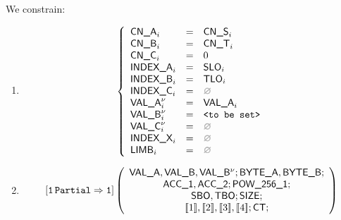 \begin{center}
\end{center}

We constrain:
\begin{enumerate}
	\item 
		\[
			\left\{ \begin{array}{lclr}
				\cnA      _{i}       & = & \cnS_{i}            \\
				\cnB      _{i}       & = & \cnT_{i}            \\
				\cnC      _{i}       & = & 0                   \\
				\indexA   _{i}       & = & \slo_{i}            \\
				\indexB   _{i}       & = & \tlo_{i}            \\
				\indexC   _{i}       & = & \nothing            \\
				\valA     _{i}\new{} & = & \valA_{i}           \\
				\valB     _{i}\new{} & = & \valueToBeSet       \\
				\valC     _{i}\new{} & = & \nothing            \\
				\indexX   _{i}       & = & \nothing            \\
				\limb     _{i}       & = & \nothing            \\
			\end{array} \right.
		\]
	\item 
		\[
			\onePartialToOne
			\left( \begin{array}{c}
				\valA{}, \valB{}, \valB{}\new{};
				\BYTEA{}, \BYTEB{};\\
				\acc{1}, \acc{2}; \pow{1}; \\
				\sbo{}, \tbo{}; \size{};\\
				\bit{1}, \bit{2}, \bit{3}, \bit{4}; \ct{};
			\end{array} \right)
		\]	
\end{enumerate}
